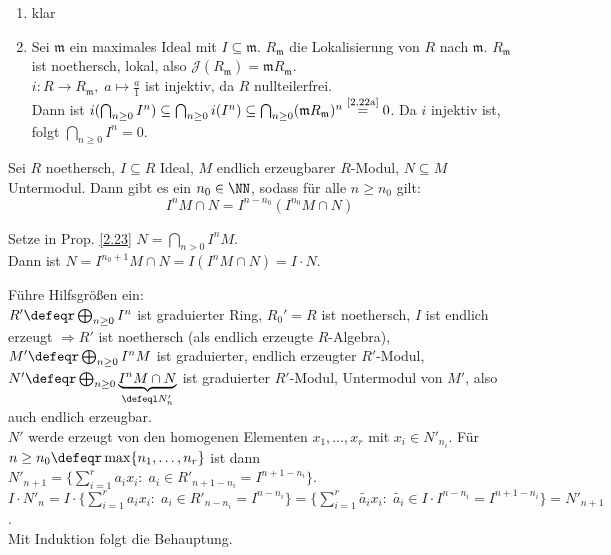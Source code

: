 \begin{Bew}
  \begin{enumerate}
    \item klar
    \item Sei $\mathfrak{m}$ ein maximales Ideal mit $I \subseteq \mathfrak{m}$.
    $R_{\mathfrak{m}}$ die Lokalisierung von $R$ nach $\mathfrak{m}$.
    $R_{\mathfrak{m}}$ ist noethersch, lokal, also $\mathcal{J}(R_\mathfrak{m}) = \mathfrak{m} R_{\mathfrak{m}}$.\\
    $i: R \to R_{\mathfrak{m}}, \; a \mapsto \frac{a}{1}$ ist injektiv, da $R$ nullteilerfrei.\\
    Dann ist $i(\bigcap_{n \geq 0} I^n) \subseteq \bigcap_{n \geq 0} i(I^n)
    \subseteq \bigcap_{n \geq 0}(\mathfrak{m} R_{\mathfrak{m}})^n
    \overset{\text{\scriptsize\ref{2.22a}}}{=} 0$. Da $i$ injektiv ist, folgt
    $\bigcap_{n \geq 0} I^n = 0$.
  \end{enumerate}
\end{Bew}

\begin{Prop}
\label{2.23}
  Sei $R$ noethersch, $I \subseteq R$ Ideal, $M$ endlich erzeugbarer $R$-Modul, $N \subseteq M$ Untermodul.
  Dann gibt es ein $n_0 \in \NN$, sodass für alle $n \geq n_0$ gilt:
  \[I^n M \cap N = I ^{n-n_0} (I^{n_0}M \cap N)\]
\end{Prop}

\begin{Bew}
  Setze in Prop. \ref{2.23} $N = \bigcap_{n > 0} I^n M$.\\
  Dann ist $N = I^{n_0 +1} M \cap N = I (I^n M \cap N) = I \cdot N$.
\end{Bew}

\begin{Bew}
  Führe Hilfsgrößen ein:\\
  $R' \defeqr \bigoplus_{n \geq 0} I^n$ ist graduierter Ring, $R_0' = R$ ist noethersch, $I$ ist endlich erzeugt $\Rightarrow R'$ ist noethersch (als endlich erzeugte $R$-Algebra), $M' \defeqr \bigoplus_{n \geq 0} I^n M$ ist graduierter, endlich erzeugter $R'$-Modul, $N' \defeqr \bigoplus_{n \geq 0} \underset{\defeql N'_n}{\underbrace{I^nM \cap N}}$ ist graduierter $R'$-Modul, Untermodul von $M'$, also auch endlich erzeugbar.\\
  $N'$ werde erzeugt von den homogenen Elementen $x_1, \dots, x_r$ mit $x_i \in N'_{n_i}$.
  Für $n \geq n_0 \defeqr \max \{n_1, \dots, n_r\}$ ist dann $N'_{n+1} = \{\sum_{i=1}^r a_i x_i: \; a_i \in R'_{n+1-n_i} = I^{n+1-n_i}\}$. $I \cdot N'_n = I \cdot \{\sum_{i=1}^r a_i x_i: \; a_i \in R'_{n-n_i} = I^{n-n_i}\} = \{\sum_{i=1}^r \tilde{a_i} x_i: \; \tilde{a_i} \in I \cdot I^{n-n_i} = I^{n+1-n_i}\} = N'_{n+1}$.\\
  Mit Induktion folgt die Behauptung.
\end{Bew}

